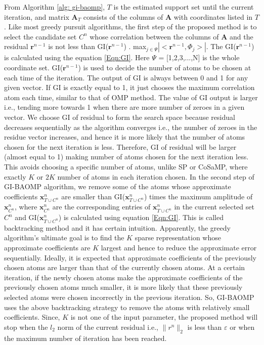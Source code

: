 \documentclass[11pt,conference]{IEEEtran}
\begin{document}
\par From Algorithm \ref{alg: gi-baomp}, $T$ is the estimated support set until the current iteration, and matrix $\mathbf{A}_T$ consists of the columns of $\mathbf{A}$ with coordinates listed in $T$. Like most greedy pursuit algorithms, the first step of the proposed method is to select the candidate set $C^n$ whose correlation between the columns of $\mathbf{A}$ and the residual $\mathbf{r}^{n-1}$ is not less than GI($\mathbf{r}^{n-1}$) . max$_{j\in \Psi} |<\mathbf{r}^{n-1},\Phi_{j}>|$. The GI($\mathbf{r}^{n-1}$) is calculated using the equation \eqref{Eqn:GI}. Here $\Psi$ = [1,2,3,...,N] is the whole coordinate set. GI($\mathbf{r}^{n-1}$) is used to decide the number of atoms to be chosen at each time of the iteration. The output of GI \cite{GI} is always between 0 and 1 for any given vector. If GI is exactly equal to 1, it just chooses the maximum correlation atom each time, similar to that of OMP method. The value of GI output is larger i.e., tending more towards 1 when there are more number of zeroes 
in a given vector. We choose GI of residual to form the search space because residual decreases sequentially as the algorithm converges i.e., the number of zeroes in the residue vector increases, and hence it is more likely that the number of atoms chosen for the next iteration is less. Therefore, GI of residual will be larger (almost equal to 1) making number of atoms chosen for the next iteration less. This avoids choosing a specific number of atoms, unlike SP or CoSaMP, where exactly $K$ or $2K$ number of atoms in each iteration chosen. In the second step of GI-BAOMP algorithm, we remove some of the atoms whose approximate coefficients $\mathbf{x}^n_{T \cup C^n}$ are smaller than GI($\mathbf{x}^n_{T \cup C^n}$) times the maximum amplitude of $\mathbf{x}^n_{C^n}$, where $\mathbf{x}^n_{C^n}$ are the corresponding entries of $\mathbf{x}^n_{T \cup C^n}$ in the current selected set $C^n$ and GI($\mathbf{x}^n_{T \cup C^n}$) is calculated using equation \eqref{Eqn:GI}. This is called backtracking method and it 
has certain intuition. Apparently, the greedy algorithm's ultimate goal is to find the $K$ sparse representation whose approximate coefficients are  $K$ largest and hence to reduce the approximate error sequentially. Ideally, it is expected that approximate coefficients of the previously chosen atoms are larger than that of the currently chosen atoms. At a certain iteration, if the newly chosen atoms make the approximate coefficients of the previously chosen atoms much smaller, it is more likely that these previously selected atoms were chosen incorrectly in the previous iteration. So, GI-BAOMP uses the above backtracking strategy to remove the atoms with relatively small coefficients. Since, $K$ is not one of the input parameter, the proposed method will stop when the $l_2$ norm of the current residual i.e., $\|r^n\|_2$ is less than $\varepsilon$ or when the maximum number of iteration has been reached. 
\end{document}
